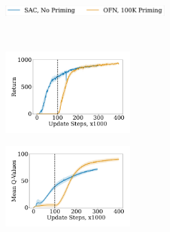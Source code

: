 \begin{figure}[t]
\begin{minipage}[t]{.60\textwidth}
\centering
    \begin{subfigure}[b]{\textwidth}
        \centering
        \includegraphics[height=0.4cm]{figures/dissecting/priming/priming_norm_return_legend.pdf}
    \end{subfigure}\\%
    \begin{subfigure}[b]{0.5\textwidth}
        \centering
        \includegraphics[width=4.8cm,clip,trim=1cm 1cm 1cm 1cm]{figures/dissecting/priming/priming_norm_return.pdf}
        \label{subfig:priming_norm_ret}
    \end{subfigure}%
    \begin{subfigure}[b]{0.5\textwidth}
        \centering
        \includegraphics[width=4.8cm,clip,trim=1cm 1cm 1cm 1cm]{figures/dissecting/priming/priming_norm_Q.pdf}
        \label{subfig:priming_norm_Q}
    \end{subfigure}%
    \vspace{-20pt}
    \caption{(Left) Return and (Right) Q-values comparing SGD result and OFN when priming for 100K steps. OFN obtains returns close to that of the well-trained SGD agent and learns an appropriate Q-value scale correctly.}
    \label{fig:priming_norm}
\end{minipage}
\hfill
\begin{minipage}[t]{.36\textwidth}
\centering
    \begin{subfigure}[b]{\textwidth}
        \hspace{15pt}

\end{subfigure}
\end{minipage}
\end{figure}
